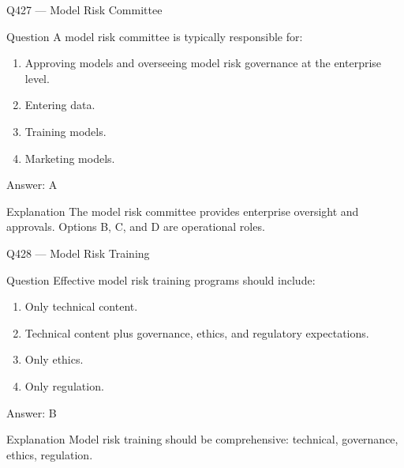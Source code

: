 \documentclass[aspectratio=169,8pt]{beamer}
\begin{document}
	\begin{frame}{Q427 --- Model Risk Committee}
		\begin{block}{Question}
			A model risk committee is typically responsible for:
			\begin{enumerate}
				\item Approving models and overseeing model risk governance at the enterprise level.
				\item Entering data.
				\item Training models.
				\item Marketing models.
			\end{enumerate}
		\end{block}
		\begin{exampleblock}{Answer: A}\end{exampleblock}
		\begin{block}{Explanation}
			The model risk committee provides enterprise oversight and approvals. Options B, C, and D are operational roles.
		\end{block}
	\end{frame}
	
	\begin{frame}{Q428 --- Model Risk Training}
		\begin{block}{Question}
			Effective model risk training programs should include:
			\begin{enumerate}
				\item Only technical content.
				\item Technical content plus governance, ethics, and regulatory expectations.
				\item Only ethics.
				\item Only regulation.
			\end{enumerate}
		\end{block}
		\begin{exampleblock}{Answer: B}\end{exampleblock}
		\begin{block}{Explanation}
			Model risk training should be comprehensive: technical, governance, ethics, regulation.
		\end{block}
	\end{frame}
	
\end{document}
